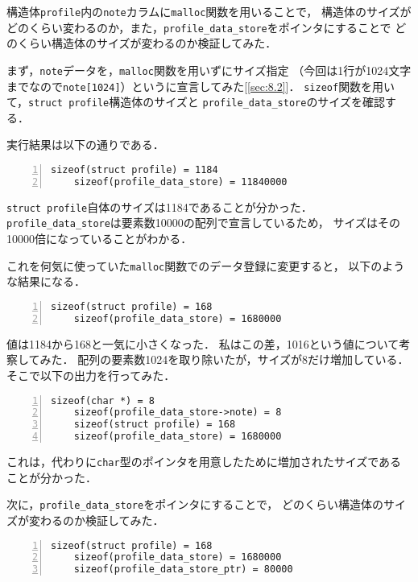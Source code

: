 \documentclass[autodetect-engine,dvi=dvipdfmx,ja=standard,
               a4j,11pt]{bxjsarticle}
\begin{document}
構造体\verb|profile|内の\verb|note|カラムに\verb|malloc|関数を用いることで，
構造体のサイズがどのくらい変わるのか，また，\verb|profile_data_store|をポインタにすることで
どのくらい構造体のサイズが変わるのか検証してみた．

まず，\verb|note|データを，\verb|malloc|関数を用いずにサイズ指定
（今回は1行が1024文字までなので\verb|note[1024]|）というに宣言してみた[\ref{sec:8.2}]．
\verb|sizeof|関数を用いて，\verb|struct profile|構造体のサイズと
\verb|profile_data_store|のサイズを確認する．

実行結果は以下の通りである．

\begin{Verbatim}[numbers=left, xleftmargin=10mm, numbersep=6pt,
    fontsize=\small, baselinestretch=0.8]
    sizeof(struct profile) = 1184
    sizeof(profile_data_store) = 11840000
\end{Verbatim}

\verb|struct profile|自体のサイズは1184であることが分かった．
\verb|profile_data_store|は要素数10000の配列で宣言しているため，
サイズはその10000倍になっていることがわかる．

これを何気に使っていた\verb|malloc|関数でのデータ登録に変更すると，
以下のような結果になる．

\begin{Verbatim}[numbers=left, xleftmargin=10mm, numbersep=6pt,
    fontsize=\small, baselinestretch=0.8]
    sizeof(struct profile) = 168
    sizeof(profile_data_store) = 1680000
\end{Verbatim}

値は1184から168と一気に小さくなった．
私はこの差，1016という値について考察してみた．
配列の要素数1024を取り除いたが，サイズが8だけ増加している．
そこで以下の出力を行ってみた．

\begin{Verbatim}[numbers=left, xleftmargin=10mm, numbersep=6pt,
    fontsize=\small, baselinestretch=0.8]
    sizeof(char *) = 8
    sizeof(profile_data_store->note) = 8
    sizeof(struct profile) = 168
    sizeof(profile_data_store) = 1680000
\end{Verbatim}

これは，代わりに\verb|char|型のポインタを用意したために増加されたサイズであることが分かった．

次に，\verb|profile_data_store|をポインタにすることで，
どのくらい構造体のサイズが変わるのか検証してみた．

\begin{Verbatim}[numbers=left, xleftmargin=10mm, numbersep=6pt,
    fontsize=\small, baselinestretch=0.8]
    sizeof(struct profile) = 168
    sizeof(profile_data_store) = 1680000
    sizeof(profile_data_store_ptr) = 80000
\end{Verbatim}
\end{document}
